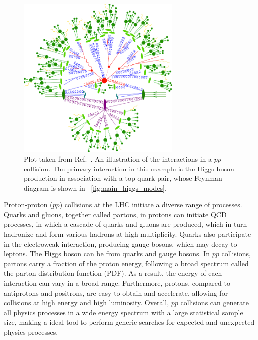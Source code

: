 \begin{figure}[!htb]
    \centering
    \captionsetup{justification=justified}
    \includegraphics[width=0.70\textwidth]{pics/LHC_CMS/sherpa_sim.png}
    \caption{Plot taken from Ref.~\cite{Gleisberg_2009}. 
             An illustration of the interactions in a $pp$ collision.
             The primary interaction in this example is the Higgs boson production in association with a top quark pair, 
             whose Feynman diagram is shown in ~\ref{fig:main_higgs_modes}.}
    \label{fig:sherpa_pp}
\end{figure}

Proton-proton ($pp$) collisions at the LHC initiate a diverse range of processes.
Quarks and gluons, together called partons, in protons can initiate QCD processes, 
in which a cascade of quarks and gluons are produced, which in turn hadronize and form various hadrons at high multiplicity.
Quarks also participate in the electroweak interaction, producing gauge bosons, which may decay to leptons.
The Higgs boson can be from quarks and gauge bosons.
In $pp$ collisions, partons carry a fraction of the proton energy, 
following a broad spectrum called the parton distribution function (PDF).
As a result, the energy of each interaction can vary in a broad range.
Furthermore, protons, compared to antiprotons and positrons, are easy to obtain and accelerate,
allowing for collisions at high energy and high luminosity.
Overall, $pp$ collisions can generate all physics processes in a wide energy spectrum with a large statistical sample size, 
making a ideal tool to perform generic searches for expected and unexpected physics processes. 

